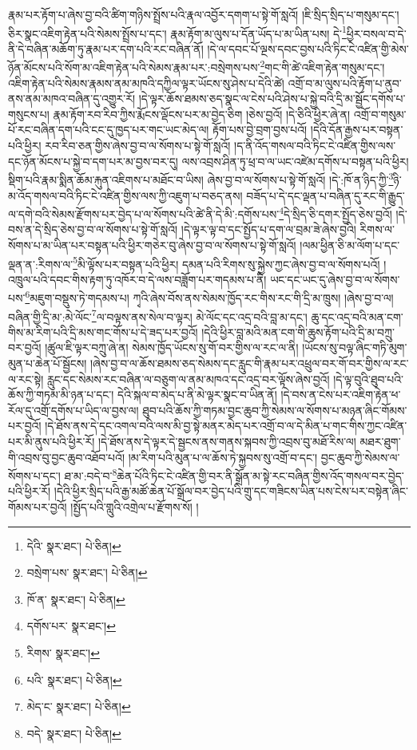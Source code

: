 རྣམ་པར་རྟོག་པ་ཞེས་བྱ་བའི་ཚིག་གཉིས་སྤྲོས་པའི་རྣལ་འབྱོར་དགག་པ་སྟེ་གོ་སླའོ། །ཇི་སྲིད་སྲིད་པ་གསུམ་དང་། ཅིར་སྣང་འཇིག་རྟེན་པའི་སེམས་སྤྲོས་པ་དང་། རྣམ་རྟོག་མ་ལུས་པ་དོན་ཡོད་པ་མ་ཡིན་པས། དེ་\footnote{དེའི་  སྣར་ཐང་།  པེ་ཅིན། }ཕྱིར་བསལ་བ་དེ་ནི་དེ་བཞིན་མཆོག་ཏུ་རྣམ་པར་དག་པའི་རང་བཞིན་ནོ། །དེ་ལ་དབང་པོ་ལྔས་དབང་བྱས་པའི་ཏིང་ངེ་འཛིན་གྱི་མེས་ཉོན་མོངས་པའི་སོག་མ་འཇིག་རྟེན་པའི་སེམས་རྣམ་པར་:བསྲེགས་པས་\footnote{བསྲེག་པས་  སྣར་ཐང་།  པེ་ཅིན། }གང་གི་ཚེ་འཇིག་རྟེན་གསུམ་དང་། འཇིག་རྟེན་པའི་སེམས་རྣམས་ནམ་མཁའི་དཀྱིལ་ལྟར་ཡོངས་སུ་ཤེས་པ་དེའི་ཚེ། འགྲོ་བ་མ་ལུས་པའི་རྟོག་པ་ནུབ་ནས་ནམ་མཁའ་བཞིན་དུ་འགྱུར་རོ། །དེ་ལྟར་ཆོས་ཐམས་ཅད་སྣང་ལ་ངེས་པའི་ཤེས་པ་སྐྱེ་བའི་དྲི་མ་སྦྱོང་དགོས་པ་གསུངས་པ། རྣམ་རྟོག་རབ་རིབ་ཀྱིས་རྨོངས་ལྡོངས་པར་མ་བྱེད་ཅིག །ཅེས་བྱའོ། །དེ་ཅིའི་ཕྱིར་ཞེ་ན། འགྲོ་བ་གསུམ་པོ་རང་བཞིན་དག་པའི་ངང་དུ་ཁྱད་པར་གང་ཡང་མེད་ལ། རྟོག་པས་བྱེ་བྲག་བྱས་པའོ། །དེའི་དོན་རྒྱས་པར་བསྟན་པའི་ཕྱིར། རབ་རིབ་ཅན་གྱིས་ཞེས་བྱ་བ་ལ་སོགས་པ་སྟེ་གོ་སླའོ། །ད་ནི་འོད་གསལ་བའི་ཏིང་ངེ་འཛིན་གྱིས་ལས་དང་ཉོན་མོངས་པ་སྐྱེ་བ་དག་པར་མ་བྱས་བར་དུ། ལས་འབྲས་ཤིན་ཏུ་ཕྲ་བ་ལ་ཡང་འཛེམ་དགོས་པ་བསྟན་པའི་ཕྱིར། སྡིག་པའི་རྣམ་སྨིན་ཆོམ་རྐུན་འཇིགས་པ་མཐོང་བ་ཡིས། ཞེས་བྱ་བ་ལ་སོགས་པ་སྟེ་གོ་སླའོ། །དེ་:ཁོ་ན་ཉིད་ཀྱི་\footnote{ཁོ་ན་  སྣར་ཐང་།  པེ་ཅིན། }ཉི་མ་འོད་གསལ་བའི་ཏིང་ངེ་འཛིན་གྱིས་ལས་ཀྱི་འཇུག་པ་བཅད་ནས། བཟོད་པ་དེ་དང་ལྡན་པ་བཞིན་དུ་རང་གི་རྒྱུད་ལ་དགེ་བའི་སེམས་རྫོགས་པར་བྱེད་པ་ལ་སོགས་པའི་ཚེ་ནི་དེ་མི་:དགོས་པས་\footnote{དགོས་པར་  སྣར་ཐང་། }དེ་སྲིད་ཅི་དགར་སྤྱོད་ཅེས་བྱའོ། །དེ་བས་ན་དེ་སྲིད་ཅེས་བྱ་བ་ལ་སོགས་པ་སྟེ་གོ་སླའོ། །དེ་ལྟར་ལྟ་བ་དང་སྤྱོད་པ་དག་ལ་བྲམ་ཟེ་ཞེས་བྱའི། རིགས་ལ་སོགས་པ་མ་ཡིན་པར་བསྟན་པའི་ཕྱིར་གཅེར་བུ་ཞེས་བྱ་བ་ལ་སོགས་པ་སྟེ་གོ་སླའོ། །ལམ་ཕྱིན་ཅི་མ་ལོག་པ་དང་ལྡན་ན་:རིགས་ལ་\footnote{རིགས་  སྣར་ཐང་། }མི་ལྟོས་པར་བསྟན་པའི་ཕྱིར། དམན་པའི་རིགས་སུ་སྐྱེས་ཀྱང་ཞེས་བྱ་བ་ལ་སོགས་པའོ། །འཁྲུལ་པའི་དབང་གིས་རྟག་ཏུ་འཁོར་བ་དེ་ལས་བཟློག་པར་གདམས་པ་ནི། ཡང་དང་ཡང་དུ་ཞེས་བྱ་བ་ལ་སོགས་པས་\footnote{པའི་  སྣར་ཐང་།  པེ་ཅིན། }མཇུག་བསྡུས་ཏེ་གདམས་པ། ཀྭའི་ཞེས་བོས་ནས་སེམས་ཁྱོད་རང་གིས་རང་གི་དྲི་མ་ཁྲུས། །ཞེས་བྱ་བ་ལ། བཞིན་གྱི་དྲི་མ་:མེ་ལོང་\footnote{མེད་ང་  སྣར་ཐང་།  པེ་ཅིན། }ལ་བལྟས་ནས་སེལ་བ་ལྟར། མེ་ལོང་དང་འདྲ་བའི་བླ་མ་དང་། ཆུ་དང་འདྲ་བའི་མན་ངག་གིས་མ་རིག་པའི་དྲི་མས་གང་གོས་པ་དེ་ཟད་པར་བྱའོ། །དེའི་ཕྱིར་བླ་མའི་མན་ངག་གི་ཆུས་རྟོག་པའི་དྲི་མ་བཀྲུ་བར་བྱའོ། །ཚུལ་ཇི་ལྟར་བཀྲུ་ཞེ་ན། སེམས་ཁྱོད་ཡོངས་སུ་གོ་བར་གྱིས་ལ་རང་ལ་ནི། །ཡོངས་སུ་བལྟ་ཞིང་གཏི་མུག་མུན་པ་ཆེན་པོ་སྦྱོངས། །ཞེས་བྱ་བ་ལ་ཆོས་ཐམས་ཅད་སེམས་དང་རླུང་གི་རྣམ་པར་འཕྲུལ་བར་གོ་བར་གྱིས་ལ་རང་ལ་རང་སྟེ། རླུང་དང་སེམས་རང་བཞིན་ལ་བཅུག་ལ་ནམ་མཁའ་དང་འདྲ་བར་ལྟོས་ཞེས་བྱའོ། །དེ་ལྟ་བུའི་ཐུབ་པའི་ཆོས་ཀྱི་གཏམ་མི་ཉན་པ་དང་། དེའི་སྐལ་བ་མེད་པ་ནི་མེ་ལྟར་སྣང་བ་ཡིན་ནོ། །དེ་བས་ན་ངེས་པར་འཇིག་རྟེན་ཕ་རོལ་དུ་འགྲོ་དགོས་པ་ཡིད་ལ་བྱས་ལ། ཐུབ་པའི་ཆོས་ཀྱི་གཏམ་བྱང་ཆུབ་ཀྱི་སེམས་ལ་སོགས་པ་མཉན་ཞིང་གོམས་པར་བྱའོ། །དེ་ཐོས་ནས་དེ་དང་འགལ་བའི་ལས་མི་བྱ་སྟེ་མནར་མེད་པར་འགྲོ་བ་ལ་དེ་མིན་པ་གང་གིས་ཀྱང་འཛིན་པར་མི་ནུས་པའི་ཕྱིར་རོ། །དེ་ཐོས་ནས་དེ་ལྟར་དེ་སྦྱངས་ནས་གནས་སྐབས་ཀྱི་འབྲས་བུ་མཐོ་རིས་ལ། མཐར་ཐུག་གི་འབྲས་བུ་བྱང་ཆུབ་འཐོབ་པའོ། །མ་རིག་པའི་མུན་པ་ལ་ཆོས་ཏེ་སྐྱབས་སུ་འགྲོ་བ་དང་། བྱང་ཆུབ་ཀྱི་སེམས་ལ་སོགས་པ་དང་། ཐ་མ་:བདེ་བ་\footnote{བདེ་  སྣར་ཐང་།  པེ་ཅིན། }ཆེན་པོའི་ཏིང་ངེ་འཛིན་གྱི་བར་ནི་སྒྲོན་མ་སྟེ་རང་བཞིན་གྱིས་འོད་གསལ་བར་བྱེད་པའི་ཕྱིར་རོ། །དེའི་ཕྱིར་སྲིད་པའི་རྒྱ་མཚོ་ཆེན་པོ་སྒྲོལ་བར་བྱེད་པའི་གྲུ་དང་གཟིངས་ཡིན་པས་ངེས་པར་བསྟེན་ཞིང་གོམས་པར་བྱའོ། །སྤྱོད་པའི་གླུའི་འགྲེལ་པ་རྫོགས་སོ། ། 